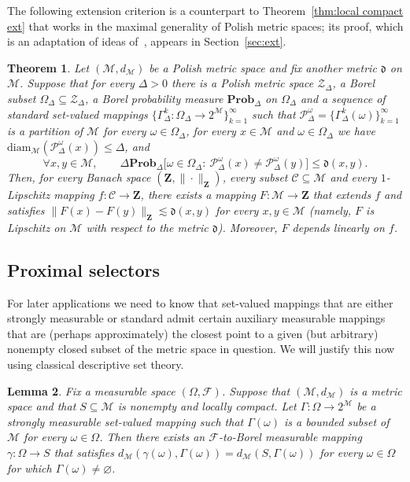 \documentclass[11pt,reqno]{amsart}
\renewcommand{\le}{\leqslant}
\newcommand{\diam}{\mathrm{diam}}
\newtheorem{theorem}{Theorem}
\newtheorem{lemma}[theorem]{Lemma}
\theoremstyle{remark}
\newcommand{\MM}{\mathcal{M}}
\renewcommand{\subset}{\subseteq}
\renewcommand{\Pr}{\mathbf{Prob}}
\renewcommand{\emptyset}{\varnothing}
\newcommand{\bfZ}{\mathbf{Z}}
\newcommand{\sub}{\mathscr{C}}
\renewcommand{\1}{\mathbf 1}
\newcommand{\Part}{\mathscr{P}}
\newcommand{\ZZ}{\mathcal{Z}}
\begin{document}
The following extension criterion is a counterpart to Theorem~\ref{thm:local compact ext} that works in the maximal generality of Polish metric spaces; its proof, which is an adaptation of ideas of~\cite{LN05},  appears in Section~\ref{sec:ext}.


\begin{theorem}\label{thm:polish extension} Let $(\MM,d_\MM)$ be a Polish metric space and fix another metric $\mathfrak{d}$ on $\MM$. Suppose that for every $\Delta>0$ there is a Polish metric space $\ZZ_\Delta$, a Borel subset $\Omega_\Delta\subset \ZZ_\Delta$, a Borel probability measure $\Pr_\Delta$ on $\Omega_\Delta$ and a sequence of standard set-valued mappings $\{\Gamma^k_\Delta:\Omega_\Delta\to 2^\MM\}_{k=1}^\infty$ such that   $\Part_\Delta^\omega=\{\Gamma^k_\Delta(\omega)\}_{k=1}^\infty$ is a partition of $\MM$ for every $\omega \in \Omega_\Delta$, for every $x\in \MM$ and $\omega\in \Omega_\Delta$ we have $\diam_\MM(\Part_\Delta^\omega(x))\le \Delta$, and
\begin{equation}
\forall x,y\in \MM,\qquad \Delta \Pr_\Delta\big[\omega\in \Omega_\Delta:\ \Part_\Delta^\omega(x)\neq\Part_\Delta^\omega(y)\big]\le \mathfrak{d}(x,y).
\end{equation}
Then, for every Banach space $(\bfZ,\|\cdot\|_\bfZ)$, every subset $\sub\subset \MM$ and every $1$-Lipschitz mapping $f:\sub\to \bfZ$, there exists  a mapping $F:\MM\to \bfZ$ that  extends $f$ and satisfies $\|F(x)-F(y)\|_\bfZ\lesssim \mathfrak{d}(x,y)$ for every $x,y\in \MM$ (namely, $F$ is Lipschitz on $\MM$ with respect to the metric $\mathfrak{d}$). Moreover, $F$ depends linearly on $f$.
\end{theorem}







\subsection{Proximal selectors}\label{sec:proximal} For later applications we need to know that  set-valued mappings that are either strongly measurable or standard  admit certain auxiliary measurable mappings that are (perhaps approximately) the closest point to a given (but arbitrary) nonempty closed subset of the metric space in question. We will justify this now using classical descriptive set theory.

\begin{lemma}\label{lem:nearest point selection criterion}
 Fix a measurable space $(\Omega,\mathscr{F})$. Suppose that $(\MM,d_\MM)$ is a metric space and that $S\subset \MM$ is nonempty and locally compact. Let $\Gamma:\Omega\to 2^\MM$ be a strongly measurable set-valued mapping such that  $\Gamma(\omega)$ is a bounded subset of $\MM$ for every $\omega\in \Omega$. Then there exists an $\mathscr{F}$-to-Borel measurable mapping $\gamma:\Omega\to S$ that satisfies $d_\MM(\gamma(\omega),\Gamma(\omega))=d_\MM(S,\Gamma(\omega))$ for every $\omega\in \Omega$ for which $\Gamma(\omega)\neq\emptyset$.
\end{lemma}
\end{document}
